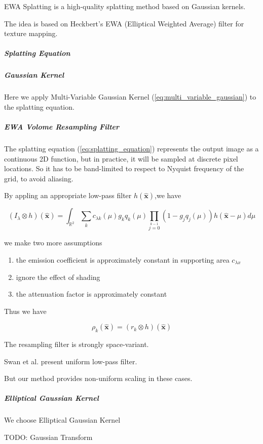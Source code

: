 EWA Splatting \cite{zwickerEWAVolumeSplatting2001} \cite{zwickerEWASplatting2002} 
is a high-quality splatting method based on Gaussian kernels.

The idea is based on Heckbert's EWA (Elliptical Weighted Average) filter for texture mapping.

\subparagraph{Splatting Equation}



\subparagraph{Gaussian Kernel}

Here we apply Multi-Variable Gaussian Kernel (\ref{eq:multi_variable_gaussian}) to the splatting equation.



\subparagraph{EWA Volome Resampling Filter}

The splatting equation (\ref{eq:splatting_equation}) represents the output image as a continuous 2D function, 
but in practice, it will be sampled at discrete pixel locations. So it has to be band-limited to respect to Nyquist frequency of the grid, to avoid aliasing.

By appling an appropriate low-pass filter $h(\hat{\mathbf{x}})$,we have 

$$(I_\lambda \otimes h)(\hat{\mathbf{x}})=
    \int_{\mathbb{R}^2}\sum\limits_{k }\limits^{} 
    c_{\lambda k}(\mu)g_kq_k(\mu)\prod\limits_{j=0}\limits^{k-1} 
    (1-g_jq_j(\mu))h(\hat{\mathbf{x}}-\mu)d\mu $$

we make two more assumptions

\begin{enumerate}
    \item the emission coefficient is approximately constant in supporting area $c_{\lambda x}$
    \item ignore the effect of shading 
    \item the attenuation factor is approximately constant 
\end{enumerate}

Thus we have 

$$\rho_k(\hat{\mathbf{x}})=(r_k \otimes h)(\hat{\mathbf{x}})$$

The resampling filter is strongly space-variant.

Swan et al. present uniform low-pass filter.

But our method provides non-uniform scaling in these cases.

\subparagraph{Elliptical Gaussian Kernel}

We choose Elliptical Gaussian Kernel 

TODO: Gaussian Transform